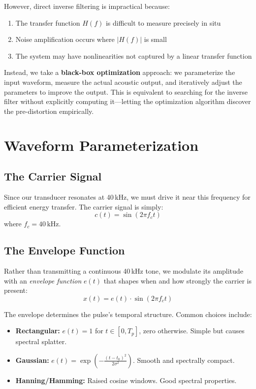 \documentclass[11pt]{article}
\begin{document}
However, direct inverse filtering is impractical because:
\begin{enumerate}
    \item The transfer function $H(f)$ is difficult to measure precisely in situ
    \item Noise amplification occurs where $|H(f)|$ is small
    \item The system may have nonlinearities not captured by a linear transfer function
\end{enumerate}

Instead, we take a \textbf{black-box optimization} approach: we parameterize the input waveform, measure the actual acoustic output, and iteratively adjust the parameters to improve the output. This is equivalent to searching for the inverse filter without explicitly computing it---letting the optimization algorithm discover the pre-distortion empirically.

\section{Waveform Parameterization}

\subsection{The Carrier Signal}

Since our transducer resonates at 40\,kHz, we must drive it near this frequency for efficient energy transfer. The carrier signal is simply:
\begin{equation}
    c(t) = \sin(2\pi f_c t)
\end{equation}
where $f_c = 40\,\text{kHz}$.

\subsection{The Envelope Function}

Rather than transmitting a continuous 40\,kHz tone, we modulate its amplitude with an \textit{envelope function} $e(t)$ that shapes when and how strongly the carrier is present:
\begin{equation}
    x(t) = e(t) \cdot \sin(2\pi f_c t)
\end{equation}

The envelope determines the pulse's temporal structure. Common choices include:
\begin{itemize}
    \item \textbf{Rectangular:} $e(t) = 1$ for $t \in [0, T_p]$, zero otherwise. Simple but causes spectral splatter.
    \item \textbf{Gaussian:} $e(t) = \exp\left(-\frac{(t-t_0)^2}{2\sigma^2}\right)$. Smooth and spectrally compact.
    \item \textbf{Hanning/Hamming:} Raised cosine windows. Good spectral properties.
\end{itemize}
\end{document}

